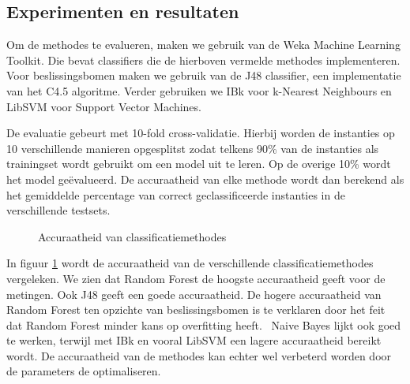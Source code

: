 \documentclass{article}
\begin{document}
\subsection{Experimenten en resultaten}
\label{afzonderlijk:experimenten}

Om de methodes te evalueren, maken we gebruik van de Weka Machine Learning Toolkit. %
Die bevat classifiers die de hierboven vermelde methodes implementeren. Voor beslissingsbomen maken we gebruik van de J48 classifier, een implementatie van het C4.5 algoritme. %
Verder gebruiken we IBk voor k-Nearest Neighbours en LibSVM voor Support Vector Machines.

De evaluatie gebeurt met 10-fold cross-validatie. Hierbij worden de instanties op 10 verschillende manieren opgesplitst zodat telkens 90\% van de instanties als trainingset wordt gebruikt om een model uit te leren. Op de overige 10\% wordt het model ge\"evalueerd. De accuraatheid van elke methode wordt dan berekend als het gemiddelde percentage van correct geclassificeerde instanties in de verschillende testsets.

\begin{figure}
\centering
{}
\caption{Accuraatheid van classificatiemethodes}
\label{fig:methodes}
\end{figure}

In figuur \ref{fig:methodes}
wordt de accuraatheid van de verschillende classificatiemethodes vergeleken. We zien dat Random Forest de hoogste accuraatheid geeft voor de metingen. Ook J48 geeft een goede accuraatheid. De hogere accuraatheid van Random Forest ten opzichte van beslissingsbomen is te verklaren door het feit dat Random Forest minder kans op overfitting heeft.~\cite{breiman:randomforests} Naive Bayes lijkt ook goed te werken, terwijl met IBk en vooral LibSVM een lagere accuraatheid bereikt wordt. De accuraatheid van de methodes kan echter wel verbeterd worden door de parameters de optimaliseren.
\end{document}
